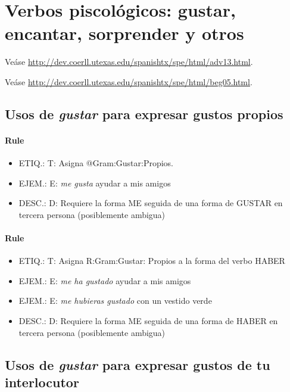 \documentclass[11pt]{report}
\begin{document}
\section{Verbos piscológicos: gustar, encantar, sorprender y otros}
Veáse \url{http://dev.coerll.utexas.edu/spanishtx/spe/html/adv13.html}.

Veáse \url{http://dev.coerll.utexas.edu/spanishtx/spe/html/beg05.html}.

\subsection{Usos de \emph{gustar} para expresar gustos propios}
\paragraph*{Rule}
\begin{itemize}
\item ETIQ.:  T: Asigna @Gram:Gustar:Propios.
\item EJEM.:  E: \emph{me gusta} ayudar a mis amigos 
\item DESC.:  D: Requiere la forma ME seguida de una forma de GUSTAR en tercera persona (posiblemente ambigua)
\end{itemize}

\paragraph*{Rule}
\begin{itemize}
\item ETIQ.:  T: Asigna R:Gram:Gustar: Propios a la forma del verbo HABER
\item EJEM.:  E: \emph{me ha gustado} ayudar a mis amigos 
\item EJEM.:  E: \emph{me hubieras gustado} con un vestido verde 
\item DESC.:  D: Requiere la forma ME seguida de una forma de HABER en tercera persona (posiblemente ambigua)
\end{itemize}

\subsection{Usos de \emph{gustar} para expresar gustos de tu interlocutor}
\end{document}
